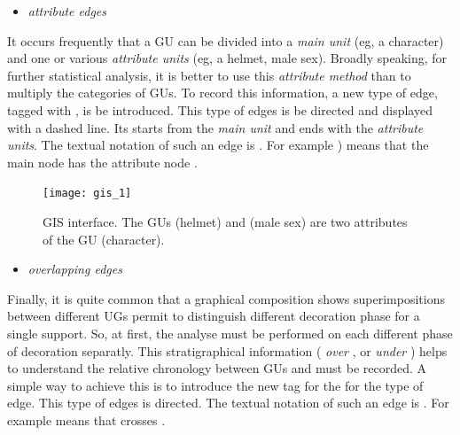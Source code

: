 \documentclass[article]{jss}\usepackage[]{graphicx}\usepackage[]{color}
\begin{document}
\begin{itemize}
  \item \emph{attribute edges}
\end{itemize}

It occurs frequently that a GU can be divided into a \emph{main unit} (eg, a character) and one or various \emph{attribute units} (eg, a helmet, male sex). Broadly speaking, for further statistical analysis, it is better to use this \emph{attribute method} than to multiply the categories of GUs. To record this information, a new type of edge, tagged with , is be introduced. This type of edges is be directed and displayed with a dashed line. Its starts from the \emph{main unit} and ends with the \emph{attribute units}. The textual notation of such an edge is . For example ) means that the main node  has the attribute node .

\begin{figure}[H] 
\centering
\texttt{[image: gis\_1]}
\caption{\label{fig:gis1} GIS interface. The GUs  (helmet) and  (male sex) are two attributes of the GU  (character).}
\end{figure}

\begin{itemize}
  \item \emph{overlapping edges}
\end{itemize}

Finally, it is quite common that a graphical composition shows superimpositions between different UGs permit to distinguish different decoration phase for a single support. So, at first, the analyse must be performed on each different phase of decoration separatly. This stratigraphical information ( \emph{over} , or  \emph{under} ) helps to understand the relative chronology between GUs and must be recorded. A simple way to achieve this is to introduce the new tag  for the for the type of edge. This type of edges is directed. The textual notation of such an edge is . For example  means that  crosses .
\end{document}
